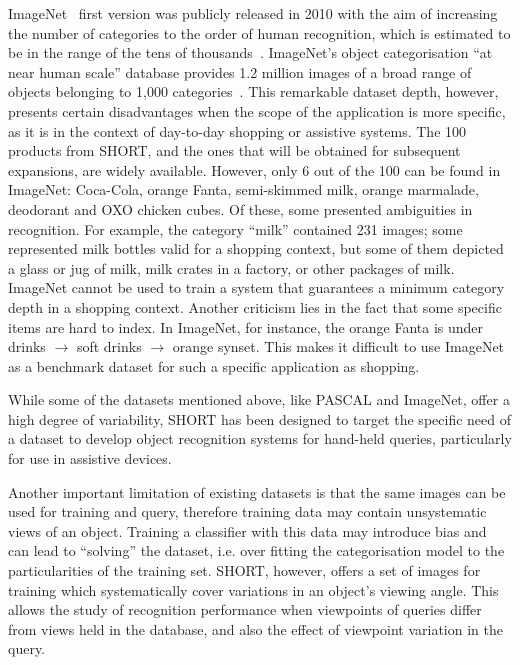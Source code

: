 ImageNet~\cite{Deng2009} first version was publicly released in 2010 with the aim of increasing the number of categories to the order of human recognition, which is estimated to be in the range of the tens of thousands~\cite{biederman1987recognition}. ImageNet's object categorisation ``at near human scale'' database provides 1.2 million images of a broad range of objects belonging to 1,000 categories~\cite{Feifei2007}. This remarkable dataset depth, however, presents certain disadvantages when the scope of the application is more specific, as it is in the context of day-to-day shopping or assistive systems. The 100 products from SHORT, and the ones that will be obtained for subsequent expansions, are widely available. However, only 6 out of the 100 can be found in ImageNet: Coca-Cola, orange Fanta, semi-skimmed milk, orange marmalade, deodorant and OXO chicken cubes. Of these, some presented ambiguities in recognition. For example, the category ``milk'' contained 231 images; some represented milk bottles valid for a shopping context, but some of them depicted a glass or jug of milk, milk crates in a factory, or other packages of milk. ImageNet cannot be used to train a system that guarantees a minimum category depth in a shopping context. Another criticism lies in the fact that some specific items are hard to index. In ImageNet, for instance, the orange Fanta is under drinks $\rightarrow$ soft drinks $\rightarrow$ orange synset. This makes it difficult to use ImageNet as a benchmark dataset for such a specific application as shopping.


While some of the datasets mentioned above, like PASCAL and ImageNet, offer a high degree of variability, SHORT has been designed to target the specific need of a dataset to develop object recognition systems for hand-held queries, particularly for use in assistive devices.

Another important limitation of existing datasets is that the same images can be used for training and query, therefore training data may contain unsystematic views of an object. Training a classifier with this data may introduce bias and can lead to ``solving'' the dataset, i.e. over fitting the categorisation model to the particularities of the training set. SHORT, however, offers a set of images for training which systematically cover variations in an object's viewing angle. This allows the study of recognition performance when viewpoints of queries differ from views held in the database, and also the effect of viewpoint variation in the query.

